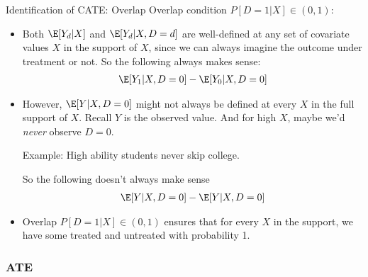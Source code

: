 \documentclass[aspectratio=169, handout]{beamer}
\begin{document}
{\footnotesize
\begin{frame}{Identification of CATE: Overlap}
Overlap condition $P[D=1|X]\in (0,1)$:
\begin{itemize}
  \item Both $\E[Y_d|X]$ and $\E[Y_d|X,D=d]$ are well-defined
    at any set of covariate values $X$ in the support of $X$, since we
    can always imagine the outcome under treatment or not.
    So the following always makes sense:
    \begin{align*}
      \E[Y_1|X,D=0]
      -
      \E[Y_0|X,D=0]
    \end{align*}


  \item
    However, $\E[Y|X,D=0]$ might not always be defined at every $X$ in
    the full support of $X$.
    Recall $Y$ is the \alert{observed} value.
    And for high $X$, maybe we'd \emph{never} observe $D=0$.

    Example: High ability students never skip college.

    So the following doesn't always make sense
    \begin{align*}
      \E[Y|X,D=0]
      -
      \E[Y|X,D=0]
    \end{align*}

  \item Overlap $P[D=1|X]\in (0,1)$ ensures that for every $X$ in the
    support, we have some treated and untreated with probability 1.
\end{itemize}
\end{frame}
}


\subsubsection{ATE}
\end{document}
